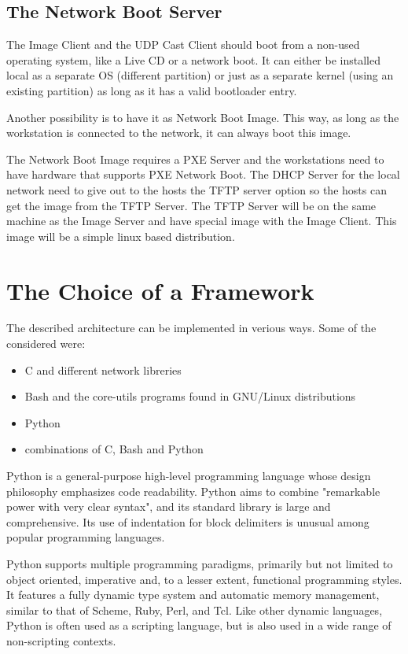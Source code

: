 \subsection{The Network Boot Server}

The Image Client and the UDP Cast Client should boot from a non-used
operating system, like a Live CD or a network boot. It can either be
installed local as a separate \ac{OS} (different partition) or just as a
separate kernel (using an existing partition) as long as it has a valid
bootloader entry.

Another possibility is to have it as Network Boot Image. This way, as long
as the workstation is connected to the network, it can always boot this
image.

The Network Boot Image requires a PXE Server and the workstations need to
have hardware that supports \ac{PXE} Network Boot. The \ac{DHCP} Server for the local
network need to give out to the hosts the \ac{TFTP} server option so the hosts
can get the image from the \ac{TFTP} Server. The \ac{TFTP} Server will be on the same
machine as the Image Server and have special image with the Image Client.
This image will be a simple linux based distribution.


\section{The Choice of a Framework}

The described architecture can be implemented in verious ways. Some of the
considered were:
\begin{itemize}
\item C and different network libreries
\item Bash and the core-utils programs found in GNU/Linux distributions
\item Python
\item combinations of C, Bash and Python
\end{itemize}

\cite{wiki:python}
Python is a general-purpose high-level programming language whose
design philosophy emphasizes code readability.  Python aims to combine
"remarkable power with very clear syntax",  and its standard library is
large and comprehensive. Its use of indentation  for block delimiters is
unusual among popular programming languages.

Python supports multiple programming paradigms, primarily but not limited
to object oriented, imperative and, to a lesser extent, functional
programming styles. It features a fully dynamic type system and automatic
memory management, similar to that of Scheme, Ruby, Perl, and Tcl. Like
other dynamic languages, Python is often used as a scripting language, but
is also used in a wide range of non-scripting contexts.

